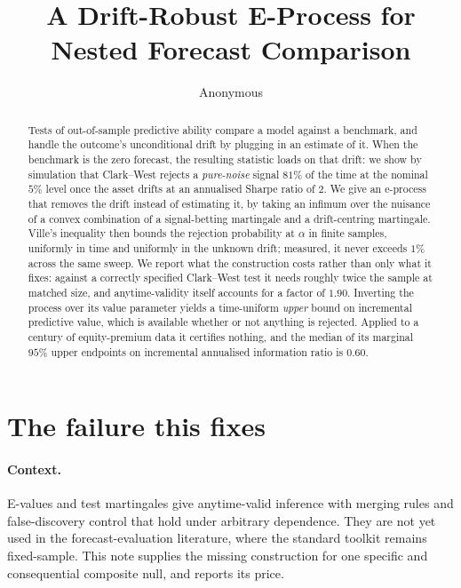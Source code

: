\documentclass{article}
\title{A Drift-Robust E-Process for Nested Forecast Comparison}
\author{Anonymous}
\begin{document}
\maketitle

\begin{abstract}
Tests of out-of-sample predictive ability compare a model against a benchmark, and handle the
outcome's unconditional drift by plugging in an estimate of it. When the benchmark is the zero
forecast, the resulting statistic loads on that drift: we show by simulation that Clark--West
rejects a \emph{pure-noise} signal $81\%$ of the time at the nominal $5\%$ level once the asset
drifts at an annualised Sharpe ratio of $2$. We give an e-process that removes the drift
instead of estimating it, by taking an infimum over the nuisance of a convex combination of a
signal-betting martingale and a drift-centring martingale. Ville's inequality then bounds the
rejection probability at $\alpha$ in finite samples, uniformly in time and uniformly in the
unknown drift; measured, it never exceeds $1\%$ across the same sweep. We report what the
construction costs rather than only what it fixes: against a correctly specified Clark--West
test it needs roughly twice the sample at matched size, and anytime-validity itself accounts
for a factor of $1.90$. Inverting the process over its value parameter yields a time-uniform
\emph{upper} bound on incremental predictive value, which is available whether or not anything
is rejected. Applied to a century of equity-premium data it certifies nothing, and the
median of its marginal $95\%$ upper endpoints on incremental annualised information ratio is
$0.60$.
\end{abstract}

\section{The failure this fixes}

\paragraph{Context.} E-values and test martingales
\citep{ville1939,shafer2019,grunwald2024,ramdas2023,waudbysmith2024} give anytime-valid
inference with merging rules \citep{vovk2021} and false-discovery control \citep{wang2022} that
hold under arbitrary dependence. They are not yet used in the forecast-evaluation literature,
where the standard toolkit remains fixed-sample. This note supplies the missing construction
for one specific and consequential composite null, and reports its price.
\end{document}
